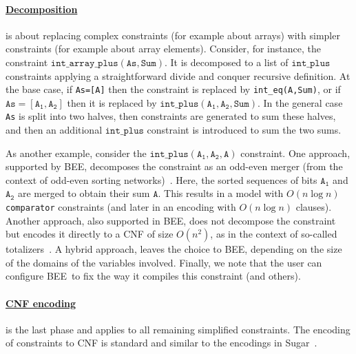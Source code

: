 \documentclass{tlp}
\newcommand{\bee}{\textsf{BEE}}
\begin{document}
\vspace{-3mm}
\paragraph{\underline{Decomposition}} is about replacing complex
constraints (for example about arrays) with simpler constraints (for
example about array elements). Consider, for instance, the constraint
$\mathtt{int\_array\_plus(As,Sum)}$. It is decomposed to a list of
$\mathtt{int\_plus}$ constraints applying a straightforward divide and
conquer recursive definition. At the base case, if \texttt{As=[A]}
then the constraint is replaced by \texttt{int\_eq(A,Sum)}, or if
$\mathtt{As=[A_1,A_2]}$ then it is replaced by
$\mathtt{int\_plus(A_1,A_2,Sum)}$.
In the general case \texttt{As} is split into two halves, then
constraints are generated to sum these halves, and then an additional
$\mathtt{int\_plus}$ constraint is introduced to sum the two sums.







As another example, consider the $\mathtt{int\_plus(A_1,A_2,A)}$
constraint.  One approach, supported by \bee, decomposes the
constraint as an odd-even merger (from the context of odd-even sorting
networks)~\cite{Batcher68}. Here, the sorted sequences of bits
$\mathtt{A_1}$ and $\mathtt{A_2}$ are merged to obtain their sum
$\mathtt{A}$.
This results in a model  with $O(n\log n)$
\texttt{comparator} constraints (and later in an encoding with
$O(n\log n)$ clauses).
Another approach, also supported in \bee, does not decompose the
constraint but encodes it directly to a CNF of size $O(n^2)$,
as in the context of so-called totalizers~\cite{BailleuxB03}.
A hybrid approach, leaves the choice to \bee, depending on the size of
the domains of the variables involved. 
Finally, we note that the user can configure \bee\ to fix the way it
compiles this constraint (and others).









\paragraph{\underline{CNF encoding}} is the last phase and applies to
all remaining simplified constraints. The encoding of constraints to
CNF is standard and similar to the encodings in
Sugar~\cite{sugar2009}.
\end{document}
